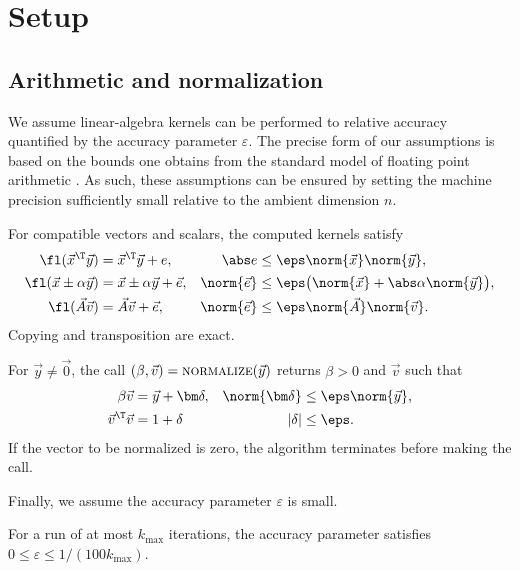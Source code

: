 \section{Setup}
\label{sec:model}

\subsection{Arithmetic and normalization}

We assume linear-algebra kernels can be performed to relative accuracy quantified by the accuracy parameter $\varepsilon$.
The precise form of our assumptions is based on the bounds one obtains from the standard model of floating point arithmetic \cite{higham2002}. 
As such, these assumptions can be ensured by setting the machine precision sufficiently small relative to the ambient dimension $n$.

\begin{assumption}
\label{ass:arithmetic}
For compatible vectors and scalars, the computed kernels satisfy
\begin{align*}
 \fl(\vec x^\T\vec y)
 &=\vec x^\T\vec y+e,
 &\abs e&\le\eps\norm{\vec x}\norm{\vec y},
 \\
 \fl(\vec x\pm\alpha\vec y)
 &=\vec x\pm\alpha\vec y+\vec e,
 &\norm{\vec e}&\le\eps
   \bigl(\norm{\vec x}+\abs\alpha\norm{\vec y}\bigr),
 \\
 \fl(\vec A\vec v)
 &=\vec A\vec v+\vec e,
 &\norm{\vec e}&\le\eps\norm{\vec A}\norm{\vec v}.
\end{align*}
Copying and transposition are exact.
\end{assumption}

\begin{assumption}[Normalization]
\label{ass:normalization}
For \(\vec y\ne\vec0\), the call \((\beta,\vec v)=\textnormal{\textsc{normalize}}(\vec y)\) returns \(\beta>0\) and \(\vec v\) such that
\begin{align*}
 \beta\vec v&=\vec y+\bm\delta,
 &\norm{\bm\delta}&\le\eps\norm{\vec y},
 \\
 \vec v^\T\vec v &= 1+\delta & |\delta|&\le\eps.
\end{align*}
If the vector to be normalized is zero, the algorithm terminates before making the call.
\end{assumption}

Finally, we assume the accuracy parameter $\varepsilon$ is small.
\begin{assumption}
\label{ass:small-eps}
For a run of at most $k_{\max}$ iterations, the accuracy parameter satisfies $0\leq \varepsilon \leq 1/(100k_{\max})$.
\end{assumption}

